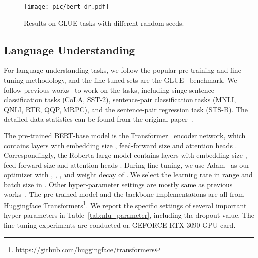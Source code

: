 \documentclass{article}
\begin{document}
\begin{table}
	\centering
	\caption{
		Hyper-parameters when fine-tuning our models on GLUE benchmark.
	}
	\label{tab:nlu_parameter}
\end{table}

\begin{figure}
	\centering
	\texttt{[image: pic/bert\_dr.pdf]}
	\caption{Results on  GLUE tasks with different random seeds.} 
	\label{fig:bert_dr}
\end{figure}

\subsection{Language Understanding}
For language understanding tasks, we follow the popular pre-training and fine-tuning methodology, and the fine-tuned sets are the GLUE~\cite{wang2018glue} benchmark. We follow previous works~\cite{clark2019electra,liu2019roberta} to work on the  tasks, including singe-sentence classification tasks (CoLA, SST-2), sentence-pair classification tasks (MNLI, QNLI, RTE, QQP, MRPC), and the sentence-pair regression task (STS-B). The detailed data statistics can be found from the original paper~\cite{wang2018glue}. 

The pre-trained BERT-base model is the Transformer~\cite{vaswani2017attention} encoder network, which contains  layers with embedding size , feed-forward size  and attention heads . Correspondingly, the Roberta-large model contains  layers with embedding size , feed-forward size  and attention heads . During fine-tuning, we use Adam~\cite{kingma2014adam} as our optimizer with , , , and  weight decay of . We select the learning rate in range  and batch size in . Other hyper-parameter settings are mostly same as previous works~\cite{liu2019roberta}. The pre-trained model and the backbone implementations are all from Huggingface Transformers\footnote{\url{https://github.com/huggingface/transformers}}. We report the specific settings of several important hyper-parameters in Table~\ref{tab:nlu_parameter}, including the dropout value. The fine-tuning experiments are conducted on  GEFORCE RTX 3090 GPU card.
\end{document}
